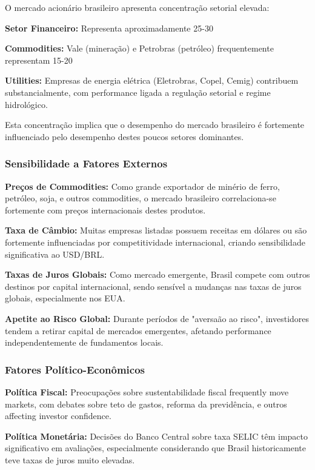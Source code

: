 O mercado acionário brasileiro apresenta concentração setorial elevada:

\textbf{Setor Financeiro:} Representa aproximadamente 25-30%

\textbf{Commodities:} Vale (mineração) e Petrobras (petróleo) frequentemente representam 15-20%

\textbf{Utilities:} Empresas de energia elétrica (Eletrobras, Copel, Cemig) contribuem substancialmente, com performance ligada a regulação setorial e regime hidrológico.

Esta concentração implica que o desempenho do mercado brasileiro é fortemente influenciado pelo desempenho destes poucos setores dominantes.

\subsubsection{Sensibilidade a Fatores Externos}

\textbf{Preços de Commodities:} Como grande exportador de minério de ferro, petróleo, soja, e outros commodities, o mercado brasileiro correlaciona-se fortemente com preços internacionais destes produtos.

\textbf{Taxa de Câmbio:} Muitas empresas listadas possuem receitas em dólares ou são fortemente influenciadas por competitividade internacional, criando sensibilidade significativa ao USD/BRL.

\textbf{Taxas de Juros Globais:} Como mercado emergente, Brasil compete com outros destinos por capital internacional, sendo sensível a mudanças nas taxas de juros globais, especialmente nos EUA.

\textbf{Apetite ao Risco Global:} Durante períodos de "aversaão ao risco", investidores tendem a retirar capital de mercados emergentes, afetando performance independentemente de fundamentos locais.

\subsubsection{Fatores Político-Econômicos}

\textbf{Política Fiscal:} Preocupações sobre sustentabilidade fiscal frequently move markets, com debates sobre teto de gastos, reforma da previdência, e outros affecting investor confidence.

\textbf{Política Monetária:} Decisões do Banco Central sobre taxa SELIC têm impacto significativo em avaliações, especialmente considerando que Brasil historicamente teve taxas de juros muito elevadas.

